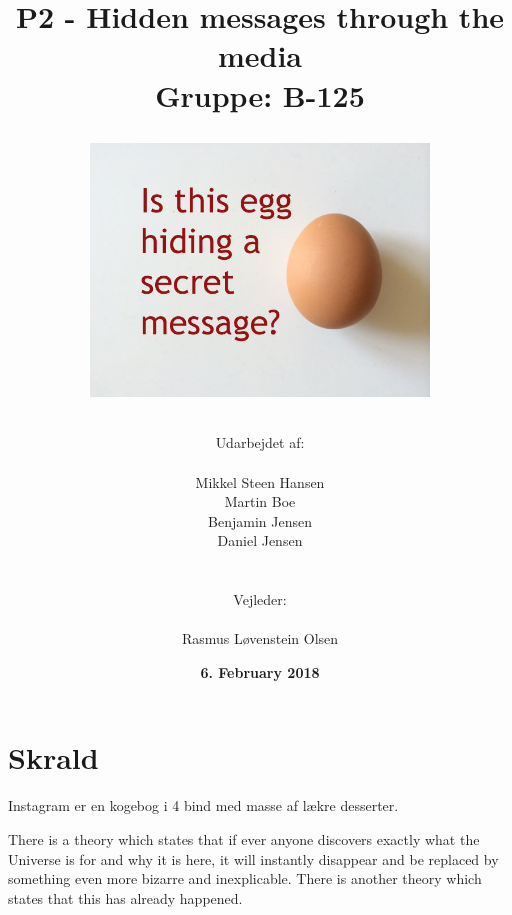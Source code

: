 \documentclass[11pt]{article}
\title{
    P2 - Hidden messages through the media 
    \\ 
    Gruppe: B-125
    \\
    \begin{figure}[!h]
        \centering
        \includegraphics[width=0.8\textwidth, angle =0]{Projectdoc/Egg-Message.jpg}
        \label{fig:robot}
    \end{figure}
}
\author{
    Udarbejdet af:\\
    \\
    Mikkel Steen Hansen\\
    Martin Boe\\
    Benjamin Jensen\\
    Daniel Jensen\\
    \\\\
    Vejleder:\\ 
    \\
    Rasmus Løvenstein Olsen\\
}
\date{\textbf{6. February 2018}}
\renewcommand{\baselinestretch}{1.20}
\begin{document}
    \begin{titlepage}
        \clearpage
        \maketitle
        \thispagestyle{empty}
    \end{titlepage}
    
    \renewcommand{\baselinestretch}{0.8} 
    \tableofcontents
    \renewcommand{\baselinestretch}{1.20} 
    
    \newpage
    
    
    
    
    
    \section{Skrald}
        Instagram er en kogebog i 4 bind med masse af lækre desserter.
        
        There is a theory which states that if ever anyone discovers exactly what the Universe is for and why it is here, it will instantly disappear and be replaced by something even more bizarre and inexplicable.
        There is another theory which states that this has already happened. \cite{knuthwebsite}
    \newpage

    
    \newpage
    
    \printbibliography
    
\end{document}
